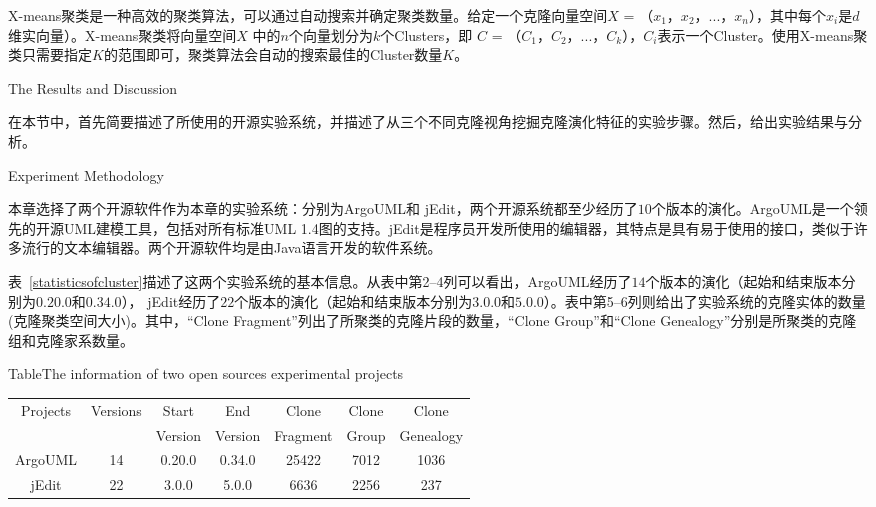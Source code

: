 X-means聚类是一种高效的聚类算法，可以通过自动搜索并确定聚类数量\cite{pelleg2000x}。给定一个克隆向量空间$X$ = {（$x_1$，$x_2$，$...$，$x_n$）}，其中每个$x_i$是$d$维实向量）。X-means聚类将向量空间$X$ 中的$n$个向量划分为$k$个Clusters，即 $C$ = {（$C_1$，$C_2$，$...$，$C_k$）}，$C_i$表示一个Cluster。使用X-means聚类只需要指定$K$的范围即可，聚类算法会自动的搜索最佳的Cluster数量$K$。


{The Results and Discussion}
\label{ref-characteristics}

在本节中，首先简要描述了所使用的开源实验系统，并描述了从三个不同克隆视角挖掘克隆演化特征的实验步骤。然后，给出实验结果与分析。

{Experiment Methodology}

本章选择了两个开源软件作为本章的实验系统：分别为ArgoUML和 jEdit，两个开源系统都至少经历了$10$个版本的演化。ArgoUML是一个领先的开源UML建模工具，包括对所有标准UML 1.4图的支持。jEdit是程序员开发所使用的编辑器，其特点是具有易于使用的接口，类似于许多流行的文本编辑器。两个开源软件均是由Java语言开发的软件系统。

表~\ref{statisticsofcluster}描述了这两个实验系统的基本信息。从表中第2--4列可以看出，ArgoUML经历了$14 $个版本的演化（起始和结束版本分别为$0.20.0$和$0.34.0$）， jEdit经历了$22$个版本的演化（起始和结束版本分别为$3.0.0$和$5.0.0$）。表中第5--6列则给出了实验系统的克隆实体的数量(克隆聚类空间大小)。其中，“Clone Fragment”列出了所聚类的克隆片段的数量，“Clone Group”和“Clone Genealogy”分别是所聚类的克隆组和克隆家系数量。

\begin{table}[htbp]
{Table$\!$}{The information of two open sources experimental projects }
\vspace{0.5em}
\centering 
\wuhao
\begin{tabular}{ccccccc}
\toprule[1.5pt ]
\multirow{2}{*}{Projects}&\multirow{2}{*}{Versions}&Start&End&Clone&Clone&Clone\\ 
&&Version&Version&Fragment&Group&Genealogy\\
\midrule[1pt]
ArgoUML&14&0.20.0&0.34.0&25422&7012&1036\\ 
jEdit&22&3.0.0&5.0.0&6636&2256	&237\\ 
\bottomrule[1.5pt]
\end{tabular}
\end{table}

